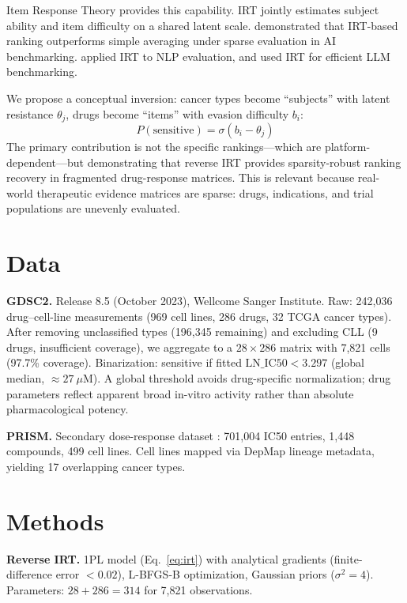 \documentclass[11pt]{article}
\begin{document}
Item Response Theory \citep[IRT;][]{lord1968,baker2004} provides this capability. IRT jointly estimates subject ability and item difficulty on a shared latent scale. \citet{kang2026efsl} demonstrated that IRT-based ranking outperforms simple averaging under sparse evaluation in AI benchmarking. \citet{rodriguez2021} applied IRT to NLP evaluation, and \citet{polo2024} used IRT for efficient LLM benchmarking.

We propose a conceptual inversion: cancer types become ``subjects'' with latent resistance $\theta_j$, drugs become ``items'' with evasion difficulty $b_i$:
\begin{equation}
P(\text{sensitive}) = \sigma(b_i - \theta_j)
\label{eq:irt}
\end{equation}
The primary contribution is not the specific rankings---which are platform-dependent---but demonstrating that reverse IRT provides sparsity-robust ranking recovery in fragmented drug-response matrices. This is relevant because real-world therapeutic evidence matrices are sparse: drugs, indications, and trial populations are unevenly evaluated.

\section{Data}

\textbf{GDSC2.} Release 8.5 (October 2023), Wellcome Sanger Institute. Raw: 242,036 drug--cell-line measurements (969 cell lines, 286 drugs, 32 TCGA cancer types). After removing unclassified types (196,345 remaining) and excluding CLL (9 drugs, insufficient coverage), we aggregate to a $28 \times 286$ matrix with 7,821 cells (97.7\% coverage). Binarization: sensitive if fitted $\text{LN\_IC50} < 3.297$ (global median, ${\approx}27~\mu$M). A global threshold avoids drug-specific normalization; drug parameters reflect apparent broad in-vitro activity rather than absolute pharmacological potency.

\textbf{PRISM.} Secondary dose-response dataset \citep{corsello2020}: 701,004 IC50 entries, 1,448 compounds, 499 cell lines. Cell lines mapped via DepMap lineage metadata, yielding 17 overlapping cancer types.

\section{Methods}

\textbf{Reverse IRT.} 1PL model (Eq.~\ref{eq:irt}) with analytical gradients (finite-difference error $< 0.02$), L-BFGS-B optimization, Gaussian priors ($\sigma^2 = 4$). Parameters: $28 + 286 = 314$ for 7,821 observations.
\end{document}
